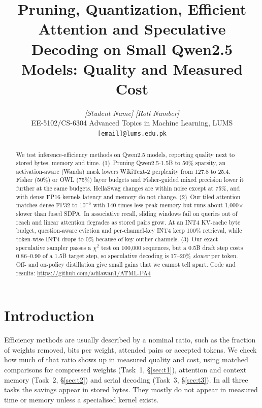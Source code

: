 \documentclass{article}
\title{Pruning, Quantization, Efficient Attention and Speculative Decoding on Small Qwen2.5 Models: Quality and Measured Cost}
\author{%
  \textit{[Student Name]} \quad \textit{[Roll Number]} \\
  EE-5102/CS-6304 Advanced Topics in Machine Learning, LUMS \\
  \texttt{[email]@lums.edu.pk}
}
\begin{document}
\maketitle

\begin{abstract}
We test inference-efficiency methods on Qwen2.5 models, reporting quality next to stored bytes, memory and time.
(1)~Pruning Qwen2.5-1.5B to 50\% sparsity, an activation-aware (Wanda) mask lowers WikiText-2 perplexity from 127.8 to 25.4. Fisher (50\%) or OWL (75\%) layer budgets and Fisher-guided mixed precision lower it further at the same budgets.
HellaSwag changes are within noise except at 75\%, and with dense FP16 kernels latency and memory do not change.
(2)~Our tiled attention matches dense FP32 to $10^{-6}$ with 140 times less peak memory but runs about 1{,}000$\times$ slower than fused SDPA. In associative recall, sliding windows fail on queries out of reach and linear attention degrades as stored pairs grow.
At an INT4 KV-cache byte budget, question-aware eviction and per-channel-key INT4 keep 100\% retrieval, while token-wise INT4 drops to 0\% because of key outlier channels.
(3)~Our exact speculative sampler passes a $\chi^2$ test on 100{,}000 sequences, but a 0.5B draft step costs 0.86--0.90 of a 1.5B target step, so speculative decoding is 17--20\% \emph{slower} per token. Off- and on-policy distillation give small gains that we cannot tell apart.
Code and results: \url{https://github.com/adilawan1/ATML-PA4}
\end{abstract}

\section{Introduction}
Efficiency methods are usually described by a nominal ratio, such as the fraction of weights removed, bits per weight, attended pairs or accepted tokens. We check how much of that ratio shows up in measured quality and cost, using matched comparisons for compressed weights (Task~1, \S\ref{sec:t1}), attention and context memory (Task~2, \S\ref{sec:t2}) and serial decoding (Task~3, \S\ref{sec:t3}).
In all three tasks the savings appear in stored bytes. They mostly do not appear in measured time or memory unless a specialised kernel exists.
\end{document}
